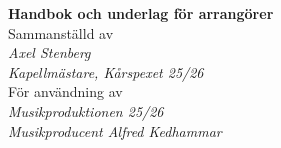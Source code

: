 \documentclass[a4paper, 10pt]{book}
\begin{document}
\begin{titlepage}
\begin{center}

 {\huge\bfseries Handbok och underlag för arrangörer\\}
 \vspace{2cm}
{Sammanställd av} \\[5pt]
\emph{{Axel Stenberg}}\\[5pt]
\emph{{Kapellmästare, Kårspexet 25/26}}\\[2cm]
{För användning av} \\[5pt]
\emph{{Musikproduktionen 25/26}}\\[5pt]
\emph{{Musikproducent Alfred Kedhammar}}\\[2cm]
\end{center}
\end{titlepage}
\tableofcontents



\end{document}
